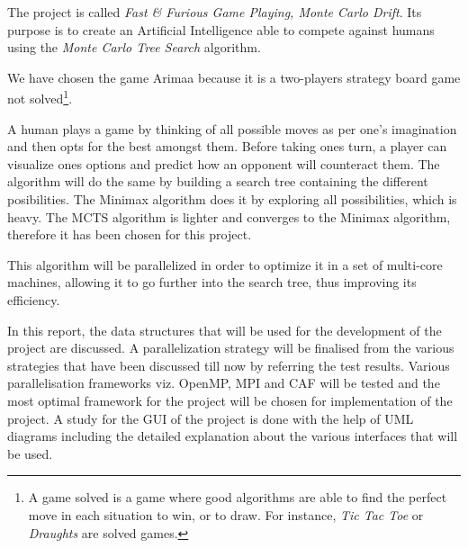 The project is called \emph{Fast \& Furious Game Playing, Monte Carlo Drift}. Its purpose is to create an Artificial Intelligence able to compete against humans using the \emph{Monte Carlo Tree Search} algorithm.

We have chosen the game Arimaa because it is a two-players strategy board game not solved\footnote{A game solved is a game where good algorithms are able to find the perfect move in each situation to win, or to draw. For instance, \textit{Tic Tac Toe} or \textit{Draughts} are solved games.}.

A human plays a game by thinking of all possible moves as per one's imagination and then opts for the best amongst them. Before taking ones turn, a player can visualize ones options and predict how an opponent will counteract them. The algorithm will do the same by building a search tree containing the different posibilities. The Minimax algorithm does it by exploring all possibilities, which is heavy. The MCTS algorithm is lighter and converges to the Minimax algorithm, therefore it has been chosen for this project.

This algorithm will be parallelized in order to optimize it in a set of multi-core machines, allowing it to go further into the search tree, thus improving its efficiency.

In this report, the data structures that will be used for the development of the project are discussed.
A parallelization strategy will be finalised from the various strategies that have been discussed till now by referring the test results. Various parallelisation frameworks viz. OpenMP, MPI and CAF will be tested and the most optimal framework for the project will be chosen for implementation of the project.
A study for the GUI of the project is done with the help of UML diagrams including the detailed explanation about the various interfaces that will be used.